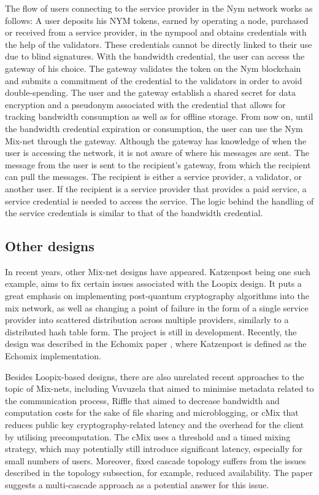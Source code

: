 The flow of users connecting to the service provider in the Nym network works as follows: A user deposits his NYM tokens, earned by operating a node, purchased or received from a service provider, in the nympool and obtains credentials with the help of the validators. These credentials cannot be directly linked to their use due to blind signatures. With the bandwidth credential, the user can access the gateway of his choice. The gateway validates the token on the Nym blockchain and submits a commitment of the credential to the validators in order to avoid double-spending. The user and the gateway establish a shared secret for data encryption and a pseudonym associated with the credential that allows for tracking bandwidth consumption as well as for offline storage. From now on, until the bandwidth credential expiration or consumption, the user can use the Nym Mix-net through the gateway. Although the gateway has knowledge of when the user is accessing the network, it is not aware of where his messages are sent. The message from the user is sent to the recipient’s gateway, from which the recipient can pull the messages. The recipient is either a service provider, a validator, or another user. If the recipient is a service provider that provides a paid service, a service credential is needed to access the service. The logic behind the handling of the service credentials is similar to that of the bandwidth credential.

\subsection{Other designs}
In recent years, other Mix-net designs have appeared.
Katzenpost \cite{katzenpost} being one such example, aims to fix certain issues associated with the Loopix design. It puts a great emphasis on implementing post-quantum cryptography algorithms into the mix network, as well as changing a point of failure in the form of a single service provider into scattered distribution across multiple providers, similarly to a distributed hash table form. The project is still in development. Recently, the design was described in the Echomix paper \cite{echomix}, where Katzenpost is defined as the Echomix implementation.

Besides Loopix-based designs, there are also unrelated recent approaches to the topic of Mix-nets, including Vuvuzela \cite{vuvuzela} that aimed to minimise metadata related to the communication process, Riffle \cite{riffle} that aimed to decrease bandwidth and computation costs for the sake of file sharing and microblogging, or cMix \cite{cmix} that reduces public key cryptography-related latency and the overhead for the client by utilising precomputation. The cMix uses a threshold and a timed mixing strategy, which may potentially still introduce significant latency, especially for small numbers of users. Moreover, fixed cascade topology suffers from the issues described in the topology subsection, for example, reduced availability. The paper suggests a multi-cascade approach as a potential answer for this issue.

